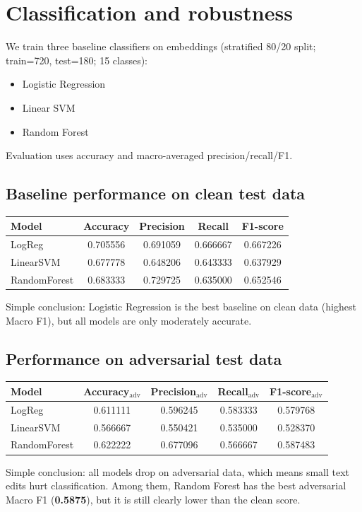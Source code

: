\documentclass[11pt,a4paper]{article}
\begin{document}
\newpage
\section{Classification and robustness}
We train three baseline classifiers on embeddings (stratified 80/20 split; train=720, test=180; 15 classes):
\begin{itemize}[leftmargin=*]
\item Logistic Regression
\item Linear SVM
\item Random Forest
\end{itemize}
Evaluation uses accuracy and macro-averaged precision/recall/F1.

\subsection{Baseline performance on clean test data}
\begin{center}
\begin{tabular}{lcccc}
\toprule
Model & Accuracy & Precision & Recall & F1-score \\
\midrule
LogReg       & 0.705556 & 0.691059 & 0.666667 & 0.667226 \\
LinearSVM    & 0.677778 & 0.648206 & 0.643333 & 0.637929 \\
RandomForest & 0.683333 & 0.729725 & 0.635000 & 0.652546 \\
\bottomrule
\end{tabular}
\end{center}
Simple conclusion: Logistic Regression is the best baseline on clean data (highest Macro F1), but all models are only moderately accurate.

\subsection{Performance on adversarial test data}
\begin{center}
\begin{tabular}{lcccc}
\toprule
Model & Accuracy$_{\text{adv}}$ & Precision$_{\text{adv}}$ & Recall$_{\text{adv}}$ & F1-score$_{\text{adv}}$ \\
\midrule
LogReg       & 0.611111 & 0.596245 & 0.583333 & 0.579768 \\
LinearSVM    & 0.566667 & 0.550421 & 0.535000 & 0.528370 \\
RandomForest & 0.622222 & 0.677096 & 0.566667 & 0.587483 \\
\bottomrule
\end{tabular}
\end{center}
\noindent Simple conclusion: all models drop on adversarial data, which means small text edits hurt classification.
Among them, Random Forest has the best adversarial Macro F1 (\textbf{0.5875}), but it is still clearly lower than the clean score.
\end{document}
